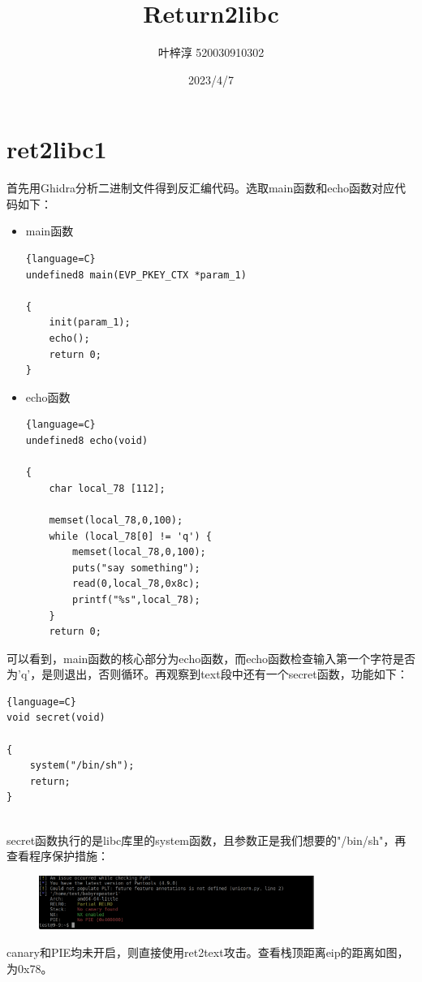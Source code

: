 \documentclass{article}
\date{2023/4/7}
\title{Return2libc}
\author{叶梓淳 520030910302}
\begin{document}
\maketitle

\section{ret2libc1}
    首先用Ghidra分析二进制文件得到反汇编代码。选取main函数和echo函数对应代码如下：
    \begin{itemize}
        \item main函数
        \begin{lstlisting}{language=C}
undefined8 main(EVP_PKEY_CTX *param_1)

{
	init(param_1);
	echo();
	return 0;
}

        \end{lstlisting}
        \item echo函数
        \begin{lstlisting}{language=C}
undefined8 echo(void)

{
	char local_78 [112];
	
	memset(local_78,0,100);
	while (local_78[0] != 'q') {
		memset(local_78,0,100);
		puts("say something");
		read(0,local_78,0x8c);
		printf("%s",local_78);
	}
	return 0;
        \end{lstlisting}
  
         
    \end{itemize}
    可以看到，main函数的核心部分为echo函数，而echo函数检查输入第一个字符是否为'q'，是则退出，否则循环。再观察到text段中还有一个secret函数，功能如下：
     \begin{lstlisting}{language=C}
void secret(void)

{
	system("/bin/sh");
	return;
}     
    	
    \end{lstlisting}
    secret函数执行的是libc库里的system函数，且参数正是我们想要的"/bin/sh"，再查看程序保护措施：
    \begin{figure}[H]
    	\begin{center}
    		\includegraphics[width=0.8\textwidth]{1.png}
    	\end{center}
    \end{figure}
    canary和PIE均未开启，则直接使用ret2text攻击。查看栈顶距离eip的距离如图，为0x78。
\end{document}
